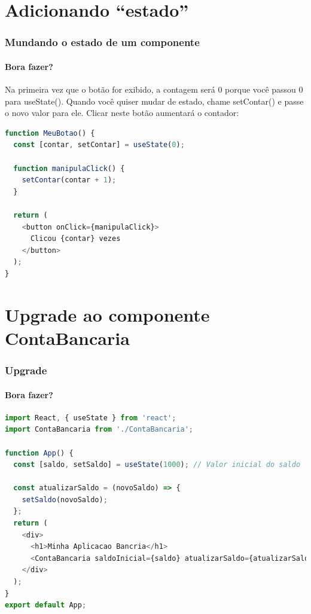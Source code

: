 \documentclass[13pt, xcolor={dvipsnames,svgnames}, portuguese]{beamer}
\begin{document}
\section{Adicionando ``estado''}

\begin{frame}[fragile]
\frametitle{Mundando o estado de um componente}
\framesubtitle{Bora fazer?}

Na primeira vez que o botão for exibido, a contagem será 0 porque você passou 0 para useState(). Quando você quiser mudar de estado, chame setContar() e passe o novo valor para ele. Clicar neste botão aumentará o contador:
\begin{lstlisting}[language=JavaScript]
function MeuBotao() {
  const [contar, setContar] = useState(0);

  function manipulaClick() {
    setContar(contar + 1);
  }

  return (
    <button onClick={manipulaClick}>
      Clicou {contar} vezes
    </button>
  );
}
\end{lstlisting}

\end{frame}
\section{Upgrade ao componente ContaBancaria}
\begin{frame}[fragile]
\frametitle{Upgrade}
\framesubtitle{Bora fazer?}

\begin{lstlisting}[language=JavaScript]
import React, { useState } from 'react';
import ContaBancaria from './ContaBancaria';

function App() {
  const [saldo, setSaldo] = useState(1000); // Valor inicial do saldo

  const atualizarSaldo = (novoSaldo) => {
    setSaldo(novoSaldo);
  };
  return (
    <div>
      <h1>Minha Aplicacao Bancria</h1>
      <ContaBancaria saldoInicial={saldo} atualizarSaldo={atualizarSaldo} />
    </div>
  );
}
export default App;
\end{lstlisting}

\end{frame}



\end{document}

